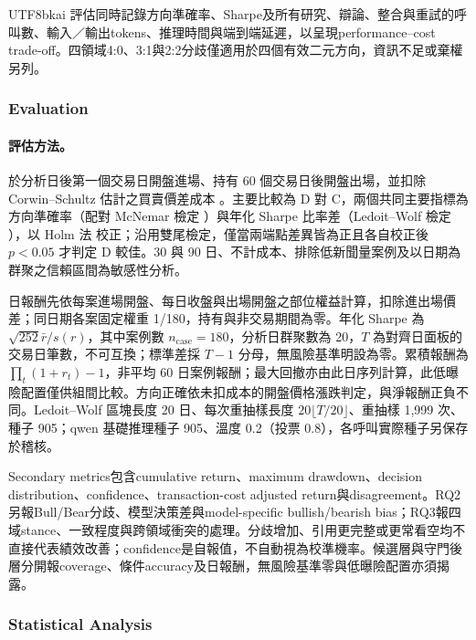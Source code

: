\documentclass[12pt,a4paper]{article}
\newcommand{\grp}[1]{\textsf{#1}}
\begin{document}
\begin{CJK}{UTF8}{bkai}
評估同時記錄方向準確率、Sharpe及所有研究、辯論、整合與重試的呼叫數、輸入／輸出tokens、推理時間與端到端延遲，以呈現performance--cost trade-off。四領域4:0、3:1與2:2分歧僅適用於四個有效二元方向，資訊不足或棄權另列。

\subsubsection{Evaluation}

\paragraph{評估方法。} 於分析日後第一個交易日開盤進場、持有 60 個交易日後開盤出場，並扣除 Corwin--Schultz 估計之買賣價差成本 \citep{corwin2012spread}。主要比較為 \grp{D} 對 \grp{C}，兩個共同主要指標為方向準確率（配對 McNemar 檢定 \citep{mcnemar1947}）與年化 Sharpe 比率差（Ledoit--Wolf 檢定 \citep{ledoit2008sharpe}），以 Holm 法 \citep{holm1979} 校正；沿用雙尾檢定，僅當兩端點差異皆為正且各自校正後 $p<0.05$ 才判定 \grp{D} 較佳。30 與 90 日、不計成本、排除低新聞量案例及以日期為群聚之信賴區間為敏感性分析。

日報酬先依每案進場開盤、每日收盤與出場開盤之部位權益計算，扣除進出場價差；同日期各案固定權重 1/180，持有與非交易期間為零。年化 Sharpe 為 $\sqrt{252}\bar r/s(r)$，其中案例數 $n_{\mathrm{case}}=180$，分析日群聚數為 20，$T$ 為對齊日面板的交易日筆數，不可互換；標準差採 $T-1$ 分母，無風險基準明設為零。累積報酬為 $\prod_t(1+r_t)-1$，非平均 60 日案例報酬；最大回撤亦由此日序列計算，此低曝險配置僅供組間比較。方向正確依未扣成本的開盤價格漲跌判定，與淨報酬正負不同。Ledoit--Wolf 區塊長度 20 日、每次重抽樣長度 $20\lfloor T/20\rfloor$、重抽樣 1,999 次、種子 905；qwen 基礎推理種子 905、溫度 0.2（投票 0.8），各呼叫實際種子另保存於稽核。



Secondary metrics包含cumulative return、maximum drawdown、decision distribution、confidence、transaction-cost adjusted return與disagreement。RQ2另報Bull/Bear分歧、模型決策差與model-specific bullish/bearish bias；RQ3報四域stance、一致程度與跨領域衝突的處理。分歧增加、引用更完整或更常看空均不直接代表績效改善；confidence是自報值，不自動視為校準機率。候選層與守門後層分開報coverage、條件accuracy及日報酬，無風險基準零與低曝險配置亦須揭露。

\subsubsection{Statistical Analysis}


\end{CJK}
\end{document}
